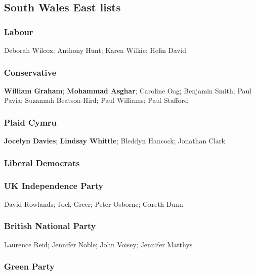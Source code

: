 \vfill

\subsection*{South Wales East lists}

\begin{resultsiii}
\subsubsection*{Labour}

Deborah Wilcox; Anthony Hunt; Karen Wilkie; Hefin David

\subsubsection*{Conservative}

\textbf{William Graham}; \textbf{Mohammad Asghar}; Caroline Oag; Benjamin Smith; Paul Pavia; Suzannah Beatson-Hird; Paul Williams; Paul Stafford

\subsubsection*{Plaid Cymru}

\textbf{Jocelyn Davies}; \textbf{Lindsay Whittle}; Bleddyn Hancock; Jonathan Clark

\subsubsection*{Liberal Democrats}


\subsubsection*{UK Independence Party}

David Rowlands; Jock Greer; Peter Osborne; Gareth Dunn

\subsubsection*{British National Party}

Laurence Reid; Jennifer Noble; John Voisey; Jennifer Matthys

\subsubsection*{Green Party}


\end{resultsiii}

